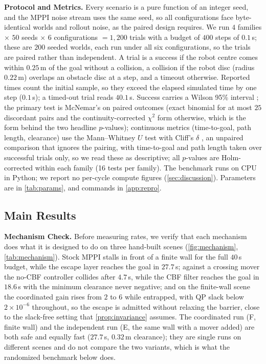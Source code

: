 \noindent\textbf{Protocol and Metrics.} Every scenario is a pure function of an integer seed, and the MPPI noise stream uses the same seed, so all configurations face byte-identical worlds and rollout noise, as the paired design requires. We run $4$ families $\times$ $50$ seeds $\times$ $6$ configurations $=1{,}200$ trials with a budget of $400$ steps of $0.1$\,s; these are $200$ seeded worlds, each run under all six configurations, so the trials are paired rather than independent. A trial is a success if the robot centre comes within $0.25$\,m of the goal without a collision, a collision if the robot disc (radius $0.22$\,m) overlaps an obstacle disc at a step, and a timeout otherwise. Reported times count the initial sample, so they exceed the elapsed simulated time by one step ($0.1$\,s); a timed-out trial reads $40.1$\,s. Success carries a Wilson 95\% interval \citep{wilson_ci}; the primary test is McNemar's \citep{mcnemar} on paired outcomes (exact binomial for at most $25$ discordant pairs and the continuity-corrected $\chi^2$ form otherwise, which is the form behind the two headline $p$-values); continuous metrics (time-to-goal, path length, clearance) use the Mann--Whitney $U$ test \citep{mann_whitney} with Cliff's $\delta$ \citep{cliff_delta}, an unpaired comparison that ignores the pairing, with time-to-goal and path length taken over successful trials only, so we read these as descriptive; all $p$-values are Holm-corrected \citep{holm} within each family (16 tests per family). The benchmark runs on CPU in Python; we report no per-cycle compute figures (\cref{sec:discussion}). Parameters are in \cref{tab:params}, and commands in \cref{app:repro}.

\subsection{Main Results}\label{sec:results}




\noindent\textbf{Mechanism Check.} Before measuring rates, we verify that each mechanism does what it is designed to do on three hand-built scenes (\cref{fig:mechanism}, \cref{tab:mechanism}). Stock MPPI stalls in front of a finite wall for the full $40$\,s budget, while the escape layer reaches the goal in $27.7$\,s; against a crossing mover the no-CBF controller collides after $4.7$\,s, while the CBF filter reaches the goal in $18.6$\,s with the minimum clearance never negative; and on the finite-wall scene the coordinated gain rises from $2$ to $6$ while entrapped, with QP slack below $2\times10^{-6}$ throughout, so the escape is admitted without relaxing the barrier, close to the slack-free setting that \cref{prop:invariance} assumes. The coordinated run (F, finite wall) and the independent run (E, the same wall with a mover added) are both safe and equally fast ($27.7$\,s, $0.32$\,m clearance); they are single runs on different scenes and do not compare the two variants, which is what the randomized benchmark below does.


